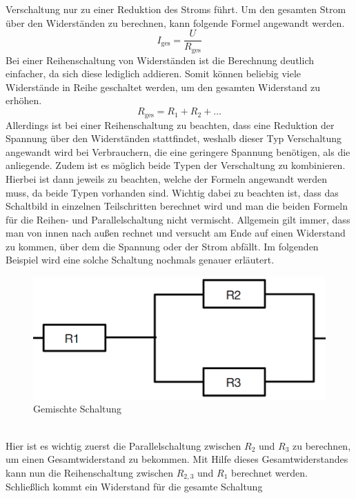 Verschaltung nur zu einer Reduktion des Stroms führt. Um den gesamten Strom über den Widerständen zu berechnen, kann folgende Formel angewandt werden.
\begin{equation}
I_{\text{ges}} = \frac{U}{R_{\text{ges}}}
\label{eqn:Gesamtstrom Parallelschaltung}
\end{equation}
Bei einer Reihenschaltung von Widerständen ist die Berechnung deutlich einfacher, da sich diese lediglich addieren. Somit können beliebig viele Widerstände in Reihe geschaltet werden, um den gesamten Widerstand zu erhöhen.
\begin{equation}
R_{\text{ges}}=R_1+R_2+\dots
\label{eqn:Widerstand Reihenschaltung}
\end{equation}
Allerdings ist bei einer Reihenschaltung zu beachten, dass eine Reduktion der Spannung über den Widerständen stattfindet, weshalb dieser Typ Verschaltung 
angewandt wird bei Verbrauchern, die eine geringere Spannung benötigen, als die anliegende. Zudem ist es möglich beide Typen der Verschaltung zu kombinieren. 
Hierbei ist dann jeweils zu beachten, welche der Formeln angewandt werden muss, da beide Typen vorhanden sind. Wichtig dabei zu beachten ist, dass das 
Schaltbild in einzelnen Teilschritten berechnet wird und man die beiden Formeln für die Reihen- und Parallelschaltung nicht vermischt. 
Allgemein gilt immer, dass man von innen nach außen rechnet und versucht am Ende auf einen Widerstand zu kommen, über dem die Spannung oder der Strom abfällt.
Im folgenden Beispiel wird eine solche Schaltung nochmals genauer erläutert.
\begin{figure}[hbt]
    \centering
    \includegraphics[width=0.8\linewidth]{images/Gemischte Schaltung}
    \caption[Gemischte Schaltung]{Gemischte Schaltung}
    \label{fig:Gemischte Schaltung}
\end{figure}
\\Hier ist es wichtig zuerst die Parallelschaltung zwischen $R_2$ und $R_3$ zu berechnen, um einen Gesamtwiderstand zu bekommen. Mit Hilfe dieses 
Gesamtwiderstandes kann nun die Reihenschaltung zwischen $R_{2,3}$ und $R_1$ berechnet werden. Schließlich kommt ein Widerstand für die gesamte Schaltung
